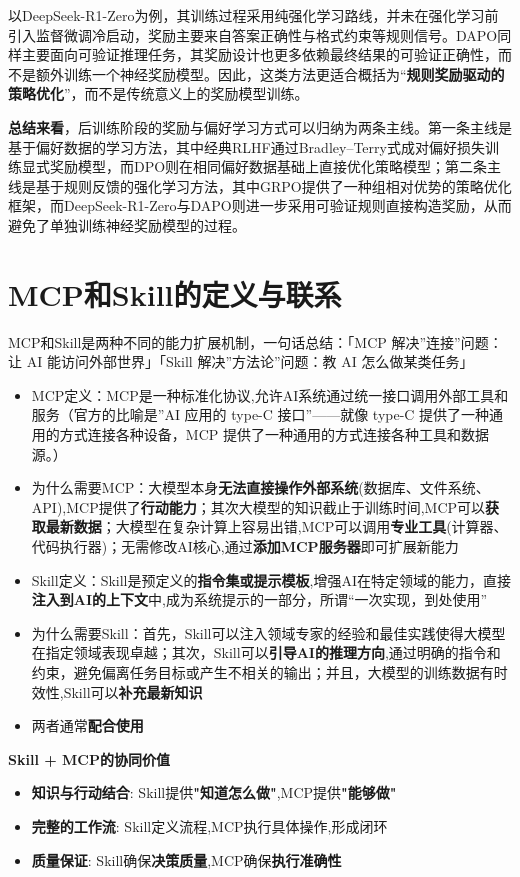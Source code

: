 \documentclass[UTF8]{ctexart}
\begin{document}
以DeepSeek-R1-Zero为例，其训练过程采用纯强化学习路线，并未在强化学习前引入监督微调冷启动，奖励主要来自答案正确性与格式约束等规则信号。DAPO同样主要面向可验证推理任务，其奖励设计也更多依赖最终结果的可验证正确性，而不是额外训练一个神经奖励模型。因此，这类方法更适合概括为“\textbf{规则奖励驱动的策略优化}”，而不是传统意义上的奖励模型训练。

\textbf{总结来看}，后训练阶段的奖励与偏好学习方式可以归纳为两条主线。第一条主线是基于偏好数据的学习方法，其中经典RLHF通过Bradley--Terry式成对偏好损失训练显式奖励模型，而DPO则在相同偏好数据基础上直接优化策略模型；第二条主线是基于规则反馈的强化学习方法，其中GRPO提供了一种组相对优势的策略优化框架，而DeepSeek-R1-Zero与DAPO则进一步采用可验证规则直接构造奖励，从而避免了单独训练神经奖励模型的过程。

\section{MCP和Skill的定义与联系}
MCP和Skill是两种不同的能力扩展机制，一句话总结：「MCP 解决”连接”问题：让 AI 能访问外部世界」「Skill 解决”方法论”问题：教 AI 怎么做某类任务」
\begin{itemize}
\item[1]MCP定义：MCP是一种标准化协议,允许AI系统通过统一接口调用外部工具和服务（官方的比喻是”AI 应用的 type-C 接口”——就像 type-C 提供了一种通用的方式连接各种设备，MCP 提供了一种通用的方式连接各种工具和数据源。）
\item[2]为什么需要MCP：大模型本身\textbf{无法直接操作外部系统}(数据库、文件系统、API),MCP提供了\textbf{行动能力}；其次大模型的知识截止于训练时间,MCP可以\textbf{获取最新数据}；大模型在复杂计算上容易出错,MCP可以调用\textbf{专业工具}(计算器、代码执行器)；无需修改AI核心,通过\textbf{添加MCP服务器}即可扩展新能力
\item[3]Skill定义：Skill是预定义的\textbf{指令集或提示模板},增强AI在特定领域的能力，直接\textbf{注入到AI的上下文}中,成为系统提示的一部分，所谓“一次实现，到处使用”
\item[4]为什么需要Skill：首先，Skill可以注入领域专家的经验和最佳实践使得大模型在指定领域表现卓越；其次，Skill可以\textbf{引导AI的推理方向},通过明确的指令和约束，避免偏离任务目标或产生不相关的输出；并且，大模型的训练数据有时效性,Skill可以\textbf{补充最新知识}
\item[5]两者通常\textbf{配合使用}
\end{itemize}

\textbf{Skill + MCP的协同价值}

\begin{itemize}
    \item \textbf{知识与行动结合}: Skill提供\textbf{"知道怎么做"},MCP提供\textbf{"能够做"}
    \item \textbf{完整的工作流}: Skill定义流程,MCP执行具体操作,形成闭环
    \item \textbf{质量保证}: Skill确保\textbf{决策质量},MCP确保\textbf{执行准确性}
\end{itemize}
\end{document}
